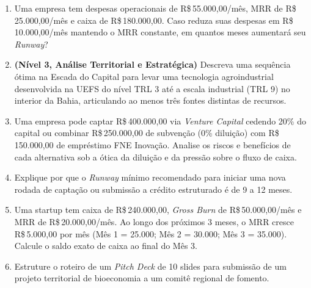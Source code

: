 \begin{enumerate}[leftmargin=1.5em, itemsep=6pt]
  \item Uma empresa tem despesas operacionais de R\$\,55.000,00/mês, MRR de R\$\,25.000,00/mês e caixa de R\$\,180.000,00. Caso reduza suas despesas em R\$\,10.000,00/mês mantendo o MRR constante, em quantos meses aumentará seu \textit{Runway}?
  \espacoResolucao[2.2cm]

  \item \textbf{(Nível 3, Análise Territorial e Estratégica)} Descreva uma sequência ótima na Escada do Capital para levar uma tecnologia agroindustrial desenvolvida na UEFS do nível TRL 3 até a escala industrial (TRL 9) no interior da Bahia, articulando ao menos três fontes distintas de recursos.
  \espacoResolucao[2.3cm]

  \item Uma empresa pode captar R\$\,400.000,00 via \textit{Venture Capital} cedendo 20\% do capital ou combinar R\$\,250.000,00 de subvenção (0\% diluição) com R\$\,150.000,00 de empréstimo FNE Inovação. Analise os riscos e benefícios de cada alternativa sob a ótica da diluição e da pressão sobre o fluxo de caixa.
  \espacoResolucao[2.3cm]

  \item Explique por que o \textit{Runway} mínimo recomendado para iniciar uma nova rodada de captação ou submissão a crédito estruturado é de 9 a 12 meses.
  \espacoResolucao[2.1cm]

  \item Uma startup tem caixa de R\$\,240.000,00, \textit{Gross Burn} de R\$\,50.000,00/mês e MRR de R\$\,20.000,00/mês. Ao longo dos próximos 3 meses, o MRR cresce R\$\,5.000,00 por mês (Mês 1 = 25.000; Mês 2 = 30.000; Mês 3 = 35.000). Calcule o saldo exato de caixa ao final do Mês 3.
  \espacoResolucao[2.4cm]

  \item Estruture o roteiro de um \textit{Pitch Deck} de 10 slides para submissão de um projeto territorial de bioeconomia a um comitê regional de fomento.
  \espacoResolucao[2.3cm]
\end{enumerate}


